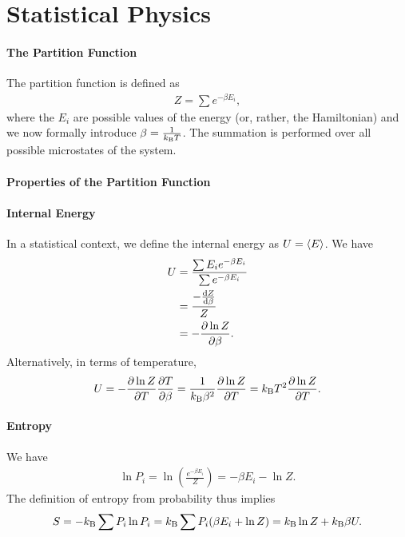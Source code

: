 \section{Statistical Physics}

\paragraph{The Partition Function}
The partition function is defined as
\begin{align*}
	Z = \sum e^{-\beta E_{i}},
\end{align*}
where the $E_{i}$ are possible values of the energy (or, rather, the Hamiltonian) and we now formally introduce $\beta = \frac{1}{k_{\text{B}} T}$. The summation is performed over all possible microstates of the system.

\paragraph{Properties of the Partition Function}

\paragraph{Internal Energy}
In a statistical context, we define the internal energy as $U = \expval{E}$. We have
\begin{align*}
	U &= \frac{\sum E_{i}e^{-\beta E_{i}}}{\sum e^{-\beta E_{i}}} \\
	  &= \frac{-\dv{Z}{\beta}}{Z} \\
	  &= -\pdv{\ln{Z}}{\beta}.
\end{align*}
Alternatively, in terms of temperature,
\begin{align*}
	U = -\pdv{\ln{Z}}{T}\pdv{T}{\beta} = \frac{1}{k_{\text{B}}\beta^{2}}\pdv{\ln{Z}}{T} = k_{\text{B}} T^{2}\pdv{\ln{Z}}{T}.
\end{align*}

\paragraph{Entropy}
We have
\begin{align*}
	\ln{P_{i}} = \ln(\frac{e^{-\beta E_{i}}}{Z}) = -\beta E_{i} - \ln{Z}.
\end{align*}
The definition of entropy from probability thus implies
\begin{align*}
	S = -k_{\text{B}}\sum P_{i}\ln{P_{i}} = k_{\text{B}}\sum P_{i}(\beta E_{i} + \ln{Z}) = k_{\text{B}}\ln{Z} + k_{\text{B}}\beta U.
\end{align*}

